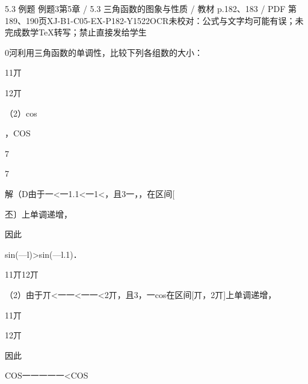 \begin{bankitem}{5.3 例题 例题3}{第5章 / 5.3 三角函数的图象与性质 / 教材 p.182、183 / PDF 第189、190页}{XJ-B1-C05-EX-P182-Y1522}{OCR未校对：公式与文字均可能有误；未完成数学TeX转写；禁止直接发给学生}
\begin{ocrdraft}
\par
0河利用三角函数的单调性，比较下列各组数的大小：
\par
11丌
\par
12丌
\par
（2）cos
\par
，COS
\par
7
\par
7
\par
[教材p.183 / PDF第190页]
\par
解（D由于一<一1.1<一1<，且3一，，在区间[
\par
丕〕上单调递增，
\par
因此
\par
sin(—l)>sin(—l.1)．
\par
11丌12丌
\par
（2）由于丌<一一<一一<2丌，且3，一cos在区间[丌，2丌]上单调递增，
\par
11丌
\par
12丌
\par
因此
\par
COS一一一一一<COS
\end{ocrdraft}
\end{bankitem}
